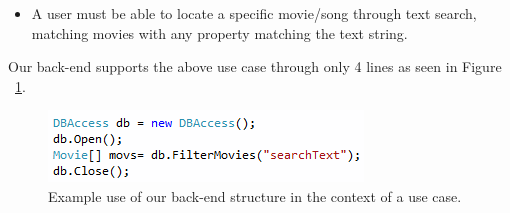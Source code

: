 \begin{itemize}
\item A user must be able to locate a specific movie/song through text search, matching movies with any property matching the text string.
\end{itemize}

Our back-end supports the above use case through only 4 lines as seen in Figure ~\ref{fig:moviesearch}.
\begin{figure}[hbt]
	\centering
	\includegraphics[scale=1]{./p1design/moviesearch.png}
	\caption{Example use of our back-end structure in the context of a use case.}
	\label{fig:moviesearch}
\end{figure}
